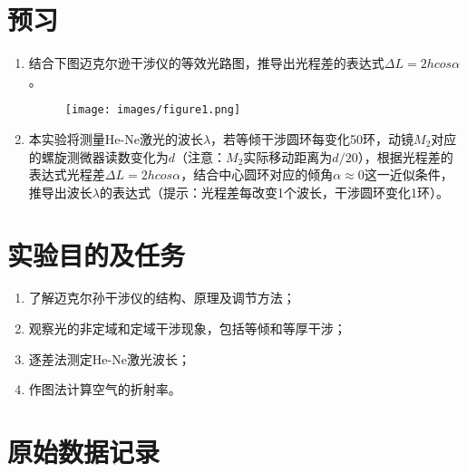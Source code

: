 \documentclass[signature=data]{physicsreport}
\begin{document}
\maketitle

\section{预习}
\begin{enumerate}
    \item 结合下图迈克尔逊干涉仪的等效光路图，推导出光程差的表达式$\Delta L = 2hcos\alpha$。
    \begin{figure}[htbp]
    \flushright
    \texttt{[image: images/figure1.png]}
    \end{figure} 
    \vspace{3cm}
    \item 本实验将测量He-Ne激光的波长$\lambda$，若等倾干涉圆环每变化50环，动镜$M_2$对应的螺旋测微器读数变化为$d$（注意：$M_2$实际移动距离为$d/20$），根据光程差的表达式光程差$\Delta L = 2hcos\alpha$，结合中心圆环对应的倾角$\alpha \approx 0$这一近似条件，推导出波长$\lambda$的表达式（提示：光程差每改变1个波长，干涉圆环变化1环）。
    \vspace{5cm}
\end{enumerate}

\makeatletter
{}
\makeatother

\section{实验目的及任务}
\begin{enumerate}
    \item 了解迈克尔孙干涉仪的结构、原理及调节方法；
    \item 观察光的非定域和定域干涉现象，包括等倾和等厚干涉；
    \item 逐差法测定He-Ne激光波长；
    \item 作图法计算空气的折射率。
\end{enumerate}
\vspace{0.7cm}
\section{原始数据记录}
\end{document}
